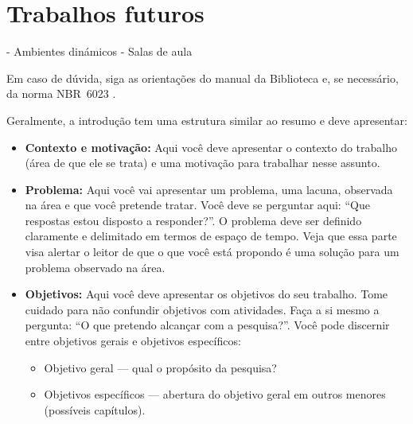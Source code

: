\documentclass[english,brazilian]{UNISINOSmonografia}
\begin{document}
	\section{Trabalhos futuros}
- Ambientes dinámicos
- Salas de aula

Em caso de dúvida, siga as orientações do manual da Biblioteca \cite{Biblioteca11} e, se necessário, da norma NBR~6023 \cite{NBR6023:2002}.


























































Geralmente, a introdução tem uma estrutura similar ao resumo e deve apresentar:
\begin{itemize}
	\item \textbf{Contexto e motivação:} Aqui você deve apresentar o contexto do trabalho (área de que ele se trata) e uma motivação para trabalhar nesse assunto.
	\item \textbf{Problema:} Aqui você vai apresentar um problema, uma lacuna, observada na área e que você pretende tratar. Você deve se perguntar aqui: ``Que respostas estou disposto a responder?''. O problema deve ser definido claramente e delimitado em termos de espaço de tempo. Veja que essa parte visa alertar o leitor de que o que você está propondo é uma solução para um problema observado na área. 
	

	\item \textbf{Objetivos:} Aqui você deve apresentar os objetivos do seu trabalho. Tome cuidado para não confundir objetivos com atividades.   Faça a si mesmo a pergunta: ``O que pretendo alcançar com a pesquisa?''. Você pode discernir entre objetivos gerais e objetivos específicos:
	\begin{itemize}
		\item Objetivo geral --- qual o propósito da pesquisa?
		\item Objetivos específicos --- abertura do objetivo geral em outros menores (possíveis capítulos).
	\end{itemize}
	
\end{itemize}


\end{document}
